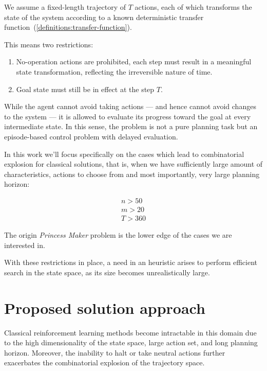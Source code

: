 \documentclass[12pt, a4paper]{article}
\begin{document}
	We assume a fixed-length trajectory of $𝑇$ actions, each of which transforms the state of the system according to a known deterministic transfer function~(\ref{definitions:transfer-function}).

	This means two restrictions:
	
	\begin{enumerate}
		\item No-operation actions are prohibited, each step must result in a meaningful state transformation, reflecting the irreversible nature of time.
		\item Goal state must still be in effect at the step $T$.
	\end{enumerate}

	While the agent cannot avoid taking actions — and hence cannot avoid changes to the system — it is allowed to evaluate its progress toward the goal at every intermediate state.
	In this sense, the problem is not a pure planning task but an episode-based control problem with delayed evaluation.
	
	In this work we'll focus specifically on the cases which lead to combinatorial explosion for classical solutions, that is, when we have sufficiently large amount of characteristics, actions to choose from and most importantly, very large planning horizon:
	
	\begin{eqnarray}
		n > 50 \\
		m > 20 \\
		T > 360
	\end{eqnarray}
	
	The origin \textit{Princess Maker} problem is the lower edge of the cases we are interested in.

	With these restrictions in place, a need in an heuristic arises to perform efficient search in the state space, as its size becomes unrealistically large.
	
	\section{Proposed solution approach}\label{section::solution}

Classical reinforcement learning methods become intractable in this domain due to the high dimensionality of the state space, large action set, and long planning horizon. Moreover, the inability to halt or take neutral actions further exacerbates the combinatorial explosion of the trajectory space.
\end{document}

